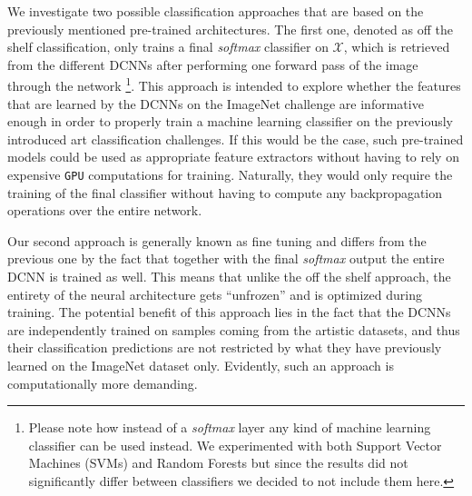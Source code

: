 \documentclass[runningheads]{llncs}
\begin{document}
We investigate two possible classification approaches that are based on the previously mentioned pre-trained architectures. The first one, denoted as off the shelf classification, only trains a final \textit{softmax} classifier on $\mathcal{X}$, which is retrieved from the different DCNNs after performing one forward pass of the image through the network \footnote{Please note how instead of a \textit{softmax} layer any kind of machine learning classifier can be used instead. We experimented with both Support Vector Machines (SVMs) and Random Forests but since the results did not significantly differ between classifiers we decided to not include them here.}. This approach is intended to explore whether the features that are learned by the DCNNs on the ImageNet challenge are informative enough in order to properly train a machine learning classifier on the previously introduced art classification challenges. If this would be the case, such pre-trained models could be used as appropriate feature extractors without having to rely on expensive \verb#GPU# computations for training. Naturally, they would only require the training of the final classifier without having to compute any backpropagation operations over the entire network. 

Our second approach is generally known as fine tuning and differs from the previous one by the fact that together with the final \textit{softmax} output the entire DCNN is trained as well. This means that unlike the off the shelf approach, the entirety of the neural architecture gets ``unfrozen'' and is optimized during training. The potential benefit of this approach lies in the fact that the DCNNs are independently trained on samples coming from the artistic datasets, and thus their classification predictions are not restricted by what they have previously learned on the ImageNet dataset only. Evidently, such an approach is computationally more demanding.
\end{document}
